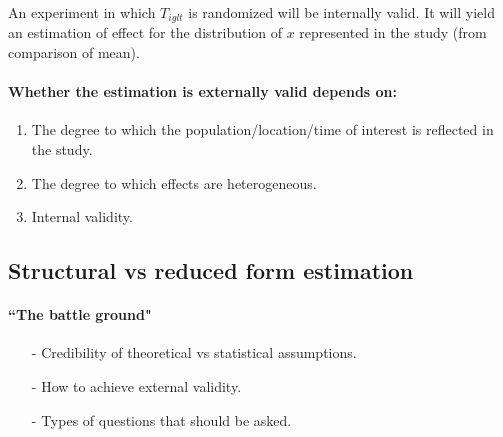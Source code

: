 \documentclass[a4paper,11pt]{article}
\begin{document}
An experiment in which $T_{iglt}$ is randomized will be internally valid. It will yield an estimation of effect for the distribution of $x$ represented in the study (from comparison of mean).
\paragraph{Whether the estimation is externally valid depends on:}
\begin{enumerate}
	\item The degree to which the population/location/time of interest is reflected in the study.
	\item The degree to which effects are heterogeneous.
	\item Internal validity.
\end{enumerate}
\subsection{Structural vs reduced form estimation}
\paragraph{``The battle ground"}
	\begin{itemize}
		\item[-] Credibility of theoretical vs statistical assumptions.
		\item[-] How to achieve external validity.
		\item[-] Types of questions that should be asked.		
	\end{itemize}
\end{document}
